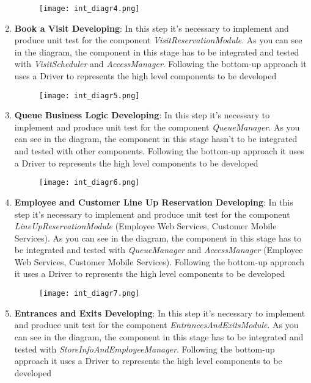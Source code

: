 \begin{enumerate}
\begin{figure}[H]
                \centering
                \texttt{[image: int\_diagr4.png]}
            \end{figure}
            \item \textbf{Book a Visit Developing}: In this step it's necessary to implement and produce unit test for the component \textit{VisitReservationModule}. As you can see in the diagram, the component in this stage has to be integrated and tested with \textit{VisitScheduler} and \textit{AccessManager}. Following the bottom-up approach it uses a Driver to represents the high level components to be developed \begin{figure}[H]
                \centering
                \texttt{[image: int\_diagr5.png]}
            \end{figure}
            \item \textbf{Queue Business Logic Developing}: In this step it's necessary to implement and produce unit test for the component \textit{QueueManager}. As you can see in the diagram, the component in this stage hasn't to be integrated and tested with other components. Following the bottom-up approach it uses a Driver to represents the high level components to be developed \begin{figure}[H]
                \centering
                \texttt{[image: int\_diagr6.png]}
            \end{figure}
            \item \textbf{Employee and Customer Line Up Reservation Developing}: In this step it's necessary to implement and produce unit test for the component \textit{LineUpReservationModule} (Employee Web Services, Customer Mobile Services). As you can see in the diagram, the component in this stage has to be integrated and tested with \textit{QueueManager} and \textit{AccessManager} (Employee Web Services, Customer Mobile Services). Following the bottom-up approach it uses a Driver to represents the high level components to be developed \begin{figure}[H]
                \centering
                \texttt{[image: int\_diagr7.png]}
            \end{figure}
            \item \textbf{Entrances and Exits Developing}: In this step it's necessary to implement and produce unit test for the component \textit{EntrancesAndExitsModule}. As you can see in the diagram, the component in this stage has to be integrated and tested with \textit{StoreInfoAndEmployeeManager}. Following the bottom-up approach it uses a Driver to represents the high level components to be developed \begin{figure}[H]

\end{figure}
\end{enumerate}
